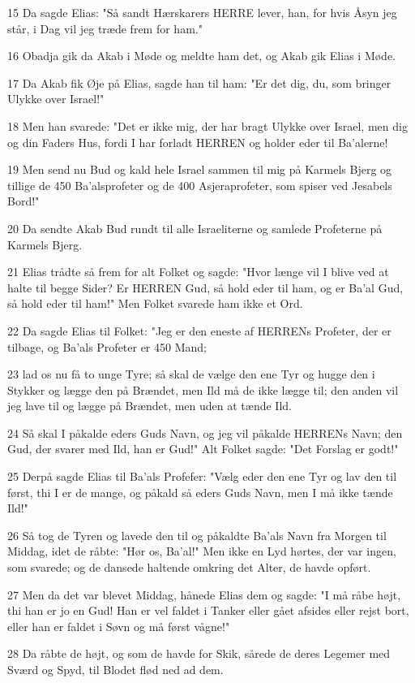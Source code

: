 \par 15 Da sagde Elias: "Så sandt Hærskarers HERRE lever, han, for hvis Åsyn jeg står, i Dag vil jeg træde frem for ham."
\par 16 Obadja gik da Akab i Møde og meldte ham det, og Akab gik Elias i Møde.
\par 17 Da Akab fik Øje på Elias, sagde han til ham: "Er det dig, du, som bringer Ulykke over Israel!"
\par 18 Men han svarede: "Det er ikke mig, der har bragt Ulykke over Israel, men dig og din Faders Hus, fordi I har forladt HERREN og holder eder til Ba'alerne!
\par 19 Men send nu Bud og kald hele Israel sammen til mig på Karmels Bjerg og tillige de 450 Ba'alsprofeter og de 400 Asjeraprofeter, som spiser ved Jesabels Bord!"
\par 20 Da sendte Akab Bud rundt til alle Israeliterne og samlede Profeterne på Karmels Bjerg.
\par 21 Elias trådte så frem for alt Folket og sagde: "Hvor længe vil I blive ved at halte til begge Sider? Er HERREN Gud, så hold eder til ham, og er Ba'al Gud, så hold eder til ham!" Men Folket svarede ham ikke et Ord.
\par 22 Da sagde Elias til Folket: "Jeg er den eneste af HERRENs Profeter, der er tilbage, og Ba'als Profeter er 450 Mand;
\par 23 lad os nu få to unge Tyre; så skal de vælge den ene Tyr og hugge den i Stykker og lægge den på Brændet, men Ild må de ikke lægge til; den anden vil jeg lave til og lægge på Brændet, men uden at tænde Ild.
\par 24 Så skal I påkalde eders Guds Navn, og jeg vil påkalde HERRENs Navn; den Gud, der svarer med Ild, han er Gud!" Alt Folket sagde: "Det Forslag er godt!"
\par 25 Derpå sagde Elias til Ba'als Profefer: "Vælg eder den ene Tyr og lav den til først, thi I er de mange, og påkald så eders Guds Navn, men I må ikke tænde Ild!"
\par 26 Så tog de Tyren og lavede den til og påkaldte Ba'als Navn fra Morgen til Middag, idet de råbte: "Hør os, Ba'al!" Men ikke en Lyd hørtes, der var ingen, som svarede; og de dansede haltende omkring det Alter, de havde opført.
\par 27 Men da det var blevet Middag, hånede Elias dem og sagde: "I må råbe højt, thi han er jo en Gud! Han er vel faldet i Tanker eller gået afsides eller rejst bort, eller han er faldet i Søvn og må først vågne!"
\par 28 Da råbte de højt, og som de havde for Skik, sårede de deres Legemer med Sværd og Spyd, til Blodet flød ned ad dem.
